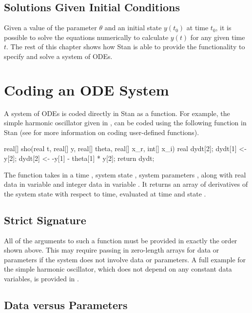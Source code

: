 \subsection{Solutions Given Initial Conditions}

Given a value of the parameter $\theta$ and an initial state $y(t_0)$
at time $t_0$, it is possible to solve the equations numerically to
calculate $y(t)$ for any given time $t$.  The rest of this chapter
shows how Stan is able to provide the functionality to specify and
solve a system of ODEs.



\section{Coding an ODE System}

A system of ODEs is coded directly in Stan as a function.  For
example, the simple harmonic oscillator given in
, can be coded using the following function in
Stan (see  for more information on
coding user-defined functions).
%
\begin{stancode}
real[] sho(real t,
           real[] y, 
           real[] theta,
           real[] x_r,
           int[] x_i) {
  real dydt[2];
  dydt[1] <- y[2];
  dydt[2] <- -y[1] - theta[1] * y[2];
  return dydt;
}
\end{stancode}
%
The function takes in a time , system state , system
parameters , along with real data in variable
 and integer data in variable .  It
returns an array of derivatives of the system state with respect to
time, evaluated at time  and state .

\subsection{Strict Signature}

All of the arguments to such a function must be provided in exactly
the order shown above.  This may require passing in zero-length
arrays for data or parameters if the system does not involve data or
parameters.  A full example for the simple harmonic oscillator, which
does not depend on any constant data variables, is provided in 
.

\subsection{Data versus Parameters}

